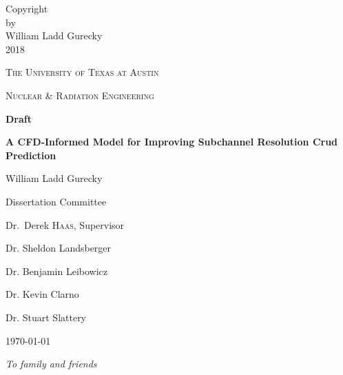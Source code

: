 

\clearpage
\vspace*{\fill}
\thispagestyle{empty} %
\doublespacing
\begin{center}
Copyright \\

by \\

William Ladd Gurecky \\

2018 \\
\end{center}
\singlespacing
\vspace*{\fill}
\pagebreak

\begin{titlepage}
	\centering
	{\scshape\LARGE The University of Texas at Austin \par}
	\vspace{1cm}
	{\scshape\Large Nuclear \& Radiation Engineering \par}
	\vspace{1.5cm}
	
	        {\huge\bfseries Draft \par}
	{\large\bfseries A CFD-Informed Model for Improving Subchannel Resolution Crud Prediction \par}

	\vspace{2cm}
	{\Large William Ladd Gurecky \par}
	\vfill

	\begin{flushright}
	Dissertation Committee \par
	\bigskip
	Dr.~Derek \textsc{Haas}, Supervisor \par
	Dr. Sheldon Landsberger \par
	Dr. Benjamin Leibowicz \par
	Dr. Kevin Clarno \par
	Dr. Stuart Slattery \par
	\end{flushright}
	\vfill
	{\large \today\par}
\end{titlepage}
\pagebreak


\clearpage
\vspace*{\fill}
\thispagestyle{empty} %
\begin{center}
\em %
To family and friends
\end{center}
\vspace*{\fill}

\pagebreak

